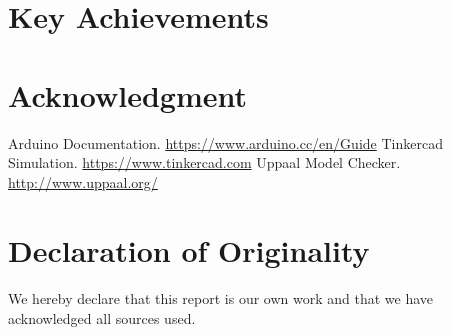 \documentclass[conference]{IEEEtran}
\begin{document}
\section{Key Achievements}


\section*{Acknowledgment}

\begin{thebibliography}{00}
 Arduino Documentation. \url{https://www.arduino.cc/en/Guide}
 Tinkercad Simulation. \url{https://www.tinkercad.com}
 Uppaal Model Checker. \url{http://www.uppaal.org/}
\end{thebibliography}

\section*{Declaration of Originality}
We hereby declare that this report is our own work and that we have acknowledged all sources used.
\end{document}
